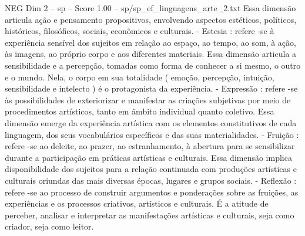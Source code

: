 \begin{textsample}{NEG Dim 2 – sp – Score 1.00 – sp/sp\_ef\_linguagens\_arte\_2.txt}
Essa dimensão articula ação e pensamento propositivos, envolvendo aspectos estéticos, políticos, históricos, filosóficos, sociais, econômicos e culturais. - Estesia : refere -se à experiência sensível dos sujeitos em relação ao espaço, ao tempo, ao som, à ação, às imagens, ao próprio corpo e aos diferentes materiais.
Essa dimensão articula a sensibilidade e a percepção, tomadas como forma de conhecer a si mesmo, o outro e o mundo.
Nela, o corpo em sua totalidade ( emoção, percepção, intuição, sensibilidade e intelecto ) é o protagonista da experiência. - Expressão : refere -se às possibilidades de exteriorizar e manifestar as criações subjetivas por meio de procedimentos artísticos, tanto em âmbito individual quanto coletivo.
Essa dimensão emerge da experiência artística com os elementos constitutivos de cada linguagem, dos seus vocabulários específicos e das suas materialidades. - Fruição : refere -se ao deleite, ao prazer, ao estranhamento, à abertura para se sensibilizar durante a participação em práticas artísticas e culturais.
Essa dimensão implica disponibilidade dos sujeitos para a relação continuada com produções artísticas e culturais oriundas das mais diversas épocas, lugares e grupos sociais. - Reflexão : refere -se ao processo de construir argumentos e ponderações sobre as fruições, as experiências e os processos criativos, artísticos e culturais.
É a atitude de perceber, analisar e interpretar as manifestações artísticas e culturais, seja como criador, seja como leitor.

\end{textsample}
